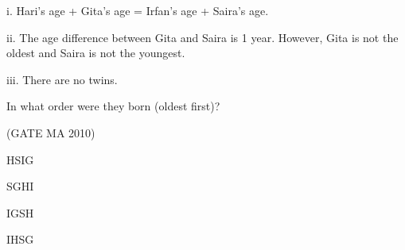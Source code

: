 \documentclass[journal,12pt,onecolumn]{IEEEtran}
\theoremstyle{remark}
\begin{document}
\begin{flushleft}
\begin{enumerate}
i. Hari's age + Gita's age = Irfan's age + Saira's age. 

ii. The age difference between Gita and Saira is 1 year. However, Gita is not the oldest and Saira is not the youngest. 

iii. There are no twins. 

In what order were they born (oldest first)?

\hfill(GATE MA 2010)

\begin{enumerate}
\begin{multicols}{4}
\item HSIG
\item SGHI
\item IGSH
\item IHSG
\end{multicols}
\end{enumerate}


\end{enumerate}
\end{flushleft}
\end{document}
